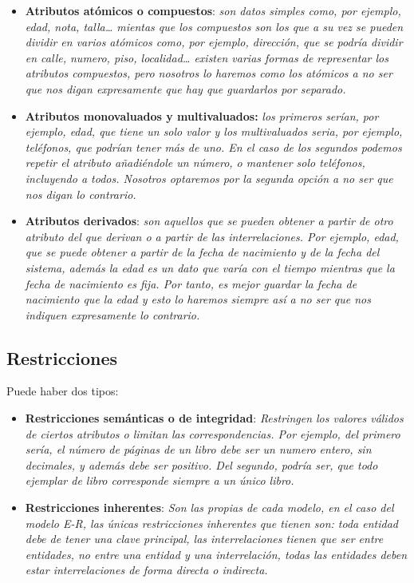 \documentclass{article}
\begin{document}
\begin{itemize}
    \item \textbf{Atributos atómicos o compuestos}: \textit{son datos simples como, por ejemplo, edad, nota, talla… mientas que los compuestos son los que a su vez se pueden dividir en varios 
    atómicos como, por ejemplo, dirección, que se podría dividir en calle, numero, piso, localidad… existen varias formas de representar los atributos compuestos, pero nosotros 
    lo haremos como los atómicos a no ser que nos digan expresamente que hay que guardarlos por separado.}
    \item \textbf{Atributos monovaluados y multivaluados:} \textit{los primeros serían, por ejemplo, edad, que tiene un solo valor y los multivaluados seria, por ejemplo, teléfonos, que podrían 
    tener más de uno. En el caso de los segundos podemos repetir el atributo añadiéndole un número, o mantener solo teléfonos, incluyendo a todos. Nosotros optaremos por la segunda opción a no 
    ser que nos digan lo contrario.}
    \item \textbf{Atributos derivados}: \textit{son aquellos que se pueden obtener a partir de otro atributo del que derivan o a partir de las interrelaciones. Por ejemplo, edad, que se puede 
    obtener a partir de la fecha de nacimiento y de la fecha del sistema, además la edad es un dato que varía con el tiempo mientras que la fecha de nacimiento es fija. Por tanto, es mejor guardar 
    la fecha de nacimiento que la edad y esto lo haremos siempre así a no ser que nos indiquen expresamente lo contrario.}
\end{itemize}

\subsection{Restricciones}
Puede haber dos tipos:
\\
\begin{itemize}
    \item \textbf{Restricciones semánticas o de integridad}: \textit{Restringen los valores válidos de ciertos atributos o limitan las correspondencias. Por ejemplo, del primero sería, el número 
    de páginas de un libro debe ser un numero entero, sin decimales, y además debe ser positivo. Del segundo, podría ser, que todo ejemplar de libro corresponde siempre a un único libro.}
    \item \textbf{Restricciones inherentes}: \textit{Son las propias de cada modelo, en el caso del modelo E-R, las únicas restricciones inherentes que tienen son: toda entidad debe de tener una 
    clave principal, las interrelaciones tienen que ser entre entidades, no entre una entidad y una interrelación, todas las entidades deben estar interrelaciones de forma directa o indirecta.}
\end{itemize}
\end{document}
